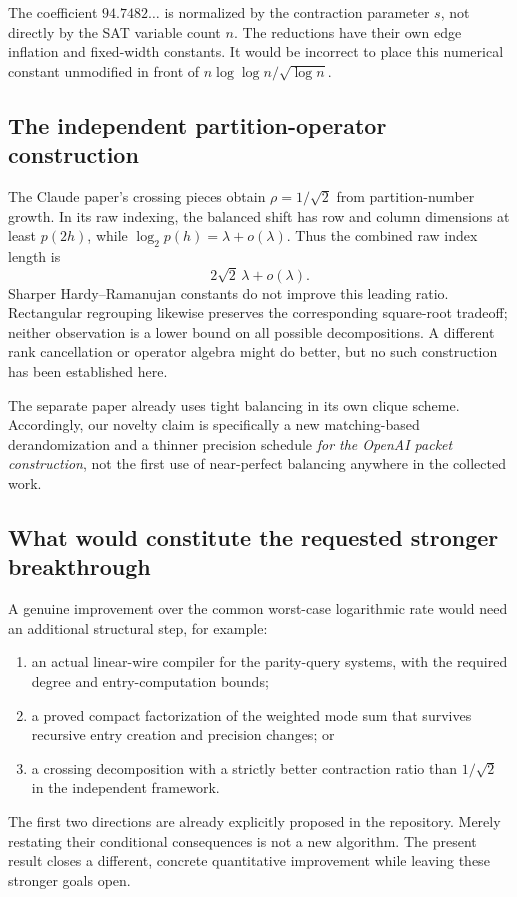 \documentclass[11pt]{article}
\theoremstyle{remark}\newtheorem{remark}[theorem]{Remark}
\begin{document}
The coefficient \(94.7482\ldots\) is normalized by the contraction parameter \(s\), not directly by the SAT variable count \(n\). The reductions have their own edge inflation and fixed-width constants. It would be incorrect to place this numerical constant unmodified in front of \(n\log\log n/\sqrt{\log n}\).

\subsection{The independent partition-operator construction}
The Claude paper's crossing pieces obtain \(\rho=1/\sqrt2\) from partition-number growth. In its raw indexing, the balanced shift has row and column dimensions at least \(p(2h)\), while \(\log_2p(h)=\lambda+o(\lambda)\). Thus the combined raw index length is
\[
 2\sqrt2\,\lambda+o(\lambda).
\]
Sharper Hardy--Ramanujan constants do not improve this leading ratio. Rectangular regrouping likewise preserves the corresponding square-root tradeoff; neither observation is a lower bound on all possible decompositions. A different rank cancellation or operator algebra might do better, but no such construction has been established here.

The separate paper already uses tight balancing in its own clique scheme. Accordingly, our novelty claim is specifically a new matching-based derandomization and a thinner precision schedule \emph{for the OpenAI packet construction}, not the first use of near-perfect balancing anywhere in the collected work.

\subsection{What would constitute the requested stronger breakthrough}
A genuine improvement over the common worst-case logarithmic rate would need an additional structural step, for example:
\begin{enumerate}
\item an actual linear-wire compiler for the parity-query systems, with the required degree and entry-computation bounds;
\item a proved compact factorization of the weighted mode sum that survives recursive entry creation and precision changes; or
\item a crossing decomposition with a strictly better contraction ratio than \(1/\sqrt2\) in the independent framework.
\end{enumerate}
The first two directions are already explicitly proposed in the repository. Merely restating their conditional consequences is not a new algorithm. The present result closes a different, concrete quantitative improvement while leaving these stronger goals open.
\end{document}
